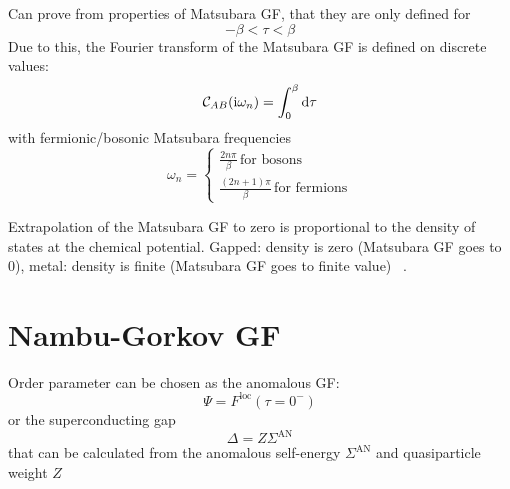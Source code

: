 \documentclass[../main.tex]{subfiles}
\begin{document}
Can prove from properties of Matsubara GF, that they are only defined for
\begin{equation}
    -\beta < \tau < \beta
\end{equation}
Due to this, the Fourier transform of the Matsubara GF is defined on discrete values:
\begin{equation}
    \mathcal{C}_{A B} (\iu \omega_n) = \int_{0}^{\beta} \odif{\tau}
\end{equation}
with fermionic/bosonic Matsubara frequencies
\begin{equation}
    \omega_n =
    \begin{cases}
        \frac{2n \pi}{\beta} \, \text{for bosons} \\
        \frac{(2n + 1)\pi}{\beta} \, \text{for fermions}
    \end{cases}
\end{equation}



Extrapolation of the Matsubara GF to zero is proportional to the density of states at the chemical potential.
Gapped: density is zero (Matsubara GF goes to 0), metal: density is finite (Matsubara GF goes to finite value) ~\cite[8.3.4]{Bruus_Flensberg_2004}.






\section{Nambu-Gorkov GF}


Order parameter can be chosen as the anomalous GF:
\begin{equation}
    \Psi = F^{\mathrm{loc}} (\tau = 0^-)
\end{equation}
or the superconducting gap
\begin{equation}
    \Delta = Z \Sigma^{\mathrm{AN}}
\end{equation}
that can be calculated from the anomalous self-energy \(\Sigma^{\mathrm{AN}}\) and quasiparticle weight \(Z\)

\end{document}
